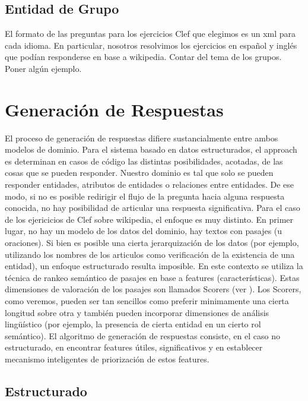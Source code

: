 \subsection{Entidad de Grupo}
\label{subsec:entidad-de-grupo}

El formato de las preguntas para los ejercicios Clef que elegimos es un xml para cada idioma. En particular, nosotros resolvimos los ejercicios en español y inglés que podían responderse en base a wikipedia. Contar del tema de los grupos. Poner algún ejemplo.

\section{Generación de Respuestas}

El proceso de generación de respuestas difiere sustancialmente entre ambos modelos de dominio. Para el sistema basado en datos estructurados, el approach es determinan en casos de código las distintas posibilidades, acotadas, de las cosas que se pueden responder. Nuestro dominio es tal que solo se pueden responder entidades, atributos de entidades o relaciones entre entidades. De ese modo, si no es posible redirigir el flujo de la pregunta hacia alguna respuesta conocida, no hay posibilidad de articular una respuesta significativa. Para el caso de los ejericicios de Clef sobre wikipedia, el enfoque es muy distinto. En primer lugar, no hay un modelo de los datos del dominio, hay textos con pasajes (u oraciones). Si bien es posible una cierta jerarquización de los datos (por ejemplo, utilizando los nombres de los articulos como verificación de la existencia de una entidad), un enfoque estructurado resulta imposible. En este contexto se utiliza la técnica de rankeo semántico de pasajes en base a features (características). Estas dimensiones de valoración de los pasajes son llamados Scorers (ver ). Los Scorers, como veremos, pueden ser tan sencillos como preferir minimamente una cierta longitud sobre otra y también pueden incorporar dimensiones de análisis lingüístico (por ejemplo, la presencia de cierta entidad en un cierto rol semántico). El algoritmo de generación de respuestas consiste, en el caso no estructurado, en encontrar features útiles, significativos y en establecer mecanismo inteligentes de priorización de estos features. 

\subsection{Estructurado}

